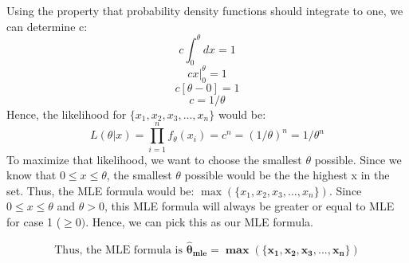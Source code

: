 \documentclass[twoside]{homework}
\begin{document}
\begin{itemize}
\begin{itemize}
        Using the property that probability density functions should integrate to one, we can determine c:
        $$c\int_{0}^{\theta}dx=1$$ 
        $$cx\Big|_0^{\theta}=1$$ 
        $$c[\theta-0]=1$$
        $$c=1/\theta$$
        Hence, the likelihood for $\{x_1,x_2,x_3,...,x_n\}$ would be:
        $$L(\theta|x)=\prod_{i=1}^{n} f_{\theta}(x_i) = c^n = ({1/\theta})^n = 1/{\theta^n}$$
        To maximize that likelihood, we want to choose the smallest $\theta$ possible. Since we know that $0\leq{x}\leq{\theta}$, the smallest $\theta$ possible would be the the highest x in the set. Thus, the MLE formula would be:
        $\max(\{x_1, x_2, x_3, ..., x_n\})$. Since $0\leq{x}\leq{\theta}$ and $\theta>0$, this MLE formula will always be greater or equal to MLE for case 1 ($\geq{0})$. Hence, we can pick this as our MLE formula.
    \end{itemize}
    $$\text{Thus, the MLE formula is }\boldsymbol{\hat{\theta}_{mle}=\max(\{x_1, x_2, x_3, ..., x_n\})}$$
\end{itemize}
\end{document}
